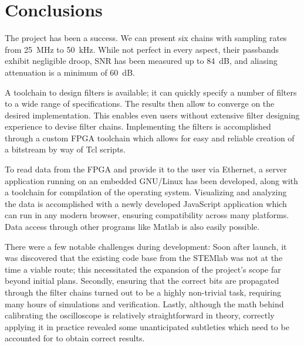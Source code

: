 %
%
\chapter{Conclusions} %
\label{ch:conclusions}
\enlargethispage{6ex}

The project has been a success. We  can present six chains with sampling rates
from  \SI{25}{\mega\Hz}  to  \SI{50}{\kilo\Hz}. While  not  perfect  in  every
aspect, their passbands exhibit negligible droop,  SNR has been measured up to
\SI{84}{\dB}, and aliasing attenuation is a minimum of \SI{60}{\dB}.

A toolchain to design filters is available; it can quickly specify a number of
filters to a wide range of specifications.  The results then allow to converge
on  the  desired implementation. This  enables  even  users without  extensive
filter designing experience to devise filter chains.  Implementing the filters
is accomplished  through a  custom FPGA  toolchain which  allows for  easy and
reliable creation of a bitstream by way of Tcl scripts.

To read data from  the FPGA and provide it to the user  via Ethernet, a server
application running on an embedded GNU/Linux  has been developed, along with a
toolchain for compilation of the operating system.  Visualizing and analyzing
the  data  is  accomplished  with a  newly  developed  JavaScript  application
which  can run  in  any  modern browser,  ensuring  compatibility across  many
platforms. Data  access through  other  programs like  Matlab  is also  easily
possible.

There were a few notable  challenges during development: Soon after launch, it
was discovered  that the existing  code base from the  STEMlab was not  at the
time a  viable route; this necessitated  the expansion of the  project's scope
far  beyond  initial  plans. Secondly,  ensuring that  the  correct  bits  are
propagated through  the filter chains  turned out  to be a  highly non-trivial
task, requiring  many hours of simulations  and verification. Lastly, although
the  math behind  calibrating the  oscilloscope is  relatively straightforward
in  theory, correctly  applying  it in  practice  revealed some  unanticipated
subtleties which need to be accounted for to obtain correct results.

